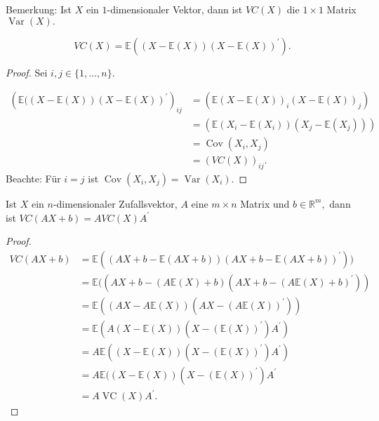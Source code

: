 \documentclass{tstextbook}
\DeclareMathOperator{\Cov}{Cov}
\DeclareMathOperator{\VC}{VC} %
\DeclareMathOperator{\Var}{Var}
\begin{document}
\begin{remark}
	Bemerkung: Ist $X$ ein $1$-dimensionaler Vektor, dann ist $VC(X)$ die $1\times1$ Matrix $\Var(X).$
\end{remark}

\begin{theorem}
    \[ VC(X)=\mathbb{E}\left((X-\mathbb{E}(X))(X-\mathbb{E}(X))^\prime \right).\]
\end{theorem}

\begin{proof}
    Sei $i,j\in\lbrace1,\ldots,n\rbrace.$

\begin{equation*}
\begin{split}
\left(\mathbb{E}((X-\mathbb{E}(X))(X-\mathbb{E}(X))^\prime\right)_{ij} & = \left(\mathbb{E}(X-\mathbb{E}(X))_i(X-\mathbb{E}(X))_j\right) \\
 & = \left(\mathbb{E}(X_i-\mathbb{E}(X_i))(X_j-\mathbb{E}(X_j))\right) \\
 &= \Cov(X_i,X_j) \\
 &= (VC(X))_{ij}. 
\end{split}
\end{equation*}
Beachte: Für $i=j$ ist $\Cov(X_i,X_j)=\Var(X_i). $
    
\end{proof}

\begin{theorem}
    Ist $X$ ein $n$-dimensionaler Zufallsvektor, $A$ eine $m\times n$ Matrix und $b\in\mathbb{R}^m,$ dann ist $VC(AX+b)=AVC(X)A^\prime$
\end{theorem}
   
        
\begin{proof}
\begin{align*}
    	VC(AX+b) & = \mathbb{E}((AX+b-\mathbb{E}(AX+b))(AX+b-\mathbb{E}(AX+b))^\prime)) \\
    	& = \mathbb{E}((AX+b-(A\mathbb{E}(X)+b)(AX+b-(A\mathbb{E}(X)+b)^\prime)) \\
    	& = \mathbb{E}((AX-A\mathbb{E}(X))(AX-(A\mathbb{E}(X))^\prime)) \\
    	& = \mathbb{E}(A(X-\mathbb{E}(X))(X-(\mathbb{E}(X))^\prime)A^\prime) \\
    	& = A\mathbb{E}((X-\mathbb{E}(X))(X-(\mathbb{E}(X))^\prime)A^\prime) \\
    	& = A\mathbb{E}((X-\mathbb{E}(X))(X-(\mathbb{E}(X))^\prime)A^\prime \\
    	& = A\VC(X)A^\prime.
\end{align*} 
\end{proof}
\end{document}
